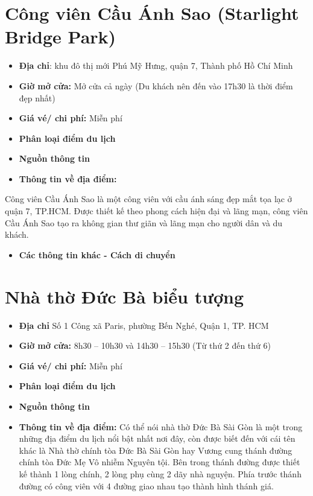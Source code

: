 \documentclass{article}
\begin{document}
\section{Công viên Cầu Ánh Sao (Starlight Bridge Park)}
\begin{itemize}
    \item{\textbf{Địa chỉ}: khu đô thị mới Phú Mỹ Hưng, quận 7, Thành phố Hồ Chí Minh}
    \item{\textbf{Giờ mở cửa:} Mở cửa cả ngày (Du khách nên đến vào 17h30 là thời điểm đẹp nhất)}
    \item{\textbf{Giá vé/ chi phí:} Miễn phí}
    \item{\textbf{Phân loại điểm du lịch} }
    \item{\textbf{Nguồn thông tin}}
    \item{\textbf{Thông tin về địa điểm:}}
\end{itemize}
Công viên Cầu Ánh Sao là một công viên với cầu ánh sáng đẹp mắt tọa lạc ở quận 7, TP.HCM. Được thiết kế theo phong cách hiện đại và lãng mạn, công viên Cầu Ánh Sao tạo ra không gian thư giãn và lãng mạn cho người dân và du khách.
\begin{itemize}
    \item{\textbf{Các thông tin khác - Cách di chuyển}}
\end{itemize}

\section{Nhà thờ Đức Bà biểu tượng}
\begin{itemize}
    \item{\textbf{Địa chỉ}} Số 1 Công xã Paris, phường Bến Nghé, Quận 1, TP. HCM
    \item{\textbf{Giờ mở cửa:}} 8h30 – 10h30 và 14h30 – 15h30 (Từ thứ 2 đến thứ 6)
    \item{\textbf{Giá vé/ chi phí:}} Miễn phí
    \item{\textbf{Phân loại điểm du lịch} }
    \item{\textbf{Nguồn thông tin}}
    \item{\textbf{Thông tin về địa điểm:}} Có thể nói nhà thờ Đức Bà Sài Gòn là một trong những địa điểm du lịch nổi bật nhất nơi đây, còn được biết đến với cái tên khác là Nhà thờ chính tòa Đức Bà Sài Gòn hay Vương cung thánh đường chính tòa Đức Mẹ Vô nhiễm Nguyên tội. Bên trong thánh đường được thiết kế thành 1 lòng chính, 2 lòng phụ cùng 2 dãy nhà nguyện. Phía trước thánh đường có công viên với 4 đường giao nhau tạo thành hình thánh giá.
\end{itemize}
\end{document}
